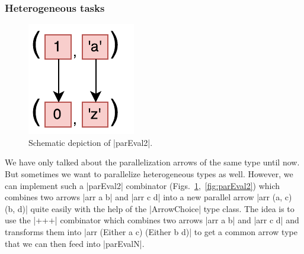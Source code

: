 \subsubsection{Heterogeneous tasks}
\begin{figure}[tb]
	\includegraphics[scale=0.7]{images/parEval2}
	\caption{Schematic depiction of |parEval2|.}
	\label{fig:parEval2Img}
\end{figure}
We have only talked about the parallelization arrows of the same type until now. But sometimes we want to parallelize heterogeneous types as well. However, we can implement such a |parEval2| combinator (Figs.~\ref{fig:parEval2Img},~\ref{fig:parEval2}) which combines two arrows |arr a b| and |arr c d| into a new parallel arrow |arr (a, c) (b, d)| quite easily with the help of the |ArrowChoice| type class. The idea is to use the |+++| combinator which combines two arrows |arr a b| and |arr c d| and transforms them into |arr (Either a c) (Either b d)| to get a common arrow type that we can then feed into |parEvalN|.


